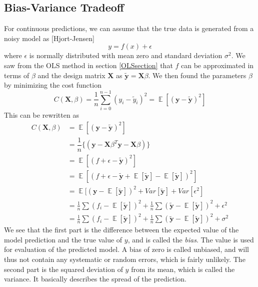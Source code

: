 \documentclass{article}
\DeclareMathOperator{\EX}{\mathbb{E}}
\begin{document}
\subsection{Bias-Variance Tradeoff}
For continuous predictions, we can assume that the true data is generated from a noisy model as [Hjort-Jensen]
\begin{equation}
y = f(x) + \epsilon
\end{equation}
where $\epsilon$ is normally distributed with mean zero and standard deviation $\sigma^{2}$. We saw from the OLS method in section \ref{OLSsection} that $f$ can be approximated in terms of $\beta$ and the design matrix $\textbf{X}$ as $\tilde{\textbf{y}} = \textbf{X} \beta$. We then found the parameters $\beta$ by minimizing the cost function
\begin{equation}\label{biastradeoff}
C(\textbf{X},\beta) = \frac{1}{n} \sum_{i=0}^{n-1} (y_{i} - \tilde{y}_{i})^{2} = \EX [(\textbf{y} - \widetilde{\textbf{y}})^{2}]
\end{equation}
This can be rewritten as
\begin{align*}\label{biastradeoff}
C(\textbf{X},\beta) &= \EX [(\textbf{y} - \widetilde{\textbf{y}})^{2}]\\
&= \dfrac{1}{n} \{( \textbf{y}-\textbf{X}\beta^{T}\textbf{y}-\textbf{X}\beta)\} \\
&= \EX [(f + \epsilon - \tilde{\textbf{y}})^{2}] \\
&= \EX [(f + \epsilon - \tilde{\textbf{y}} + \EX[\tilde{\textbf{y}}] - \EX[\tilde{\textbf{y}}])^{2}]\\
&= \EX [(\textbf{y} - \EX [\tilde{\textbf{y}}])^{2} + Var[\tilde{\textbf{y}}] + Var[\epsilon^{2}] \\
&= \frac{1}{n} \sum (f_{i} - \EX[\tilde{\textbf{y}}])^{2} + \frac{1}{n} \sum (\tilde{\textbf{y}} - \EX[\tilde{\textbf{y}}])^{2} + \epsilon^{2} \\
&= \frac{1}{n} \sum (f_{i} - \EX[\tilde{\textbf{y}}])^{2} + \frac{1}{n} \sum (\tilde{\textbf{y}} - \EX[\tilde{\textbf{y}}])^{2} + \sigma^{2}
\end{align*}
We see that the first part is the difference between the expected value of the model prediction and the true value of $y$, and is called the \textit{bias}. The value is used for evaluation of the predicted model. A bias of zero is called unbiased, and will thus not contain any systematic or random errors, which is fairly unlikely. The second part is the squared deviation of $y$ from its mean, which is called the {variance}. It basically describes the spread of the prediction.
\end{document}
